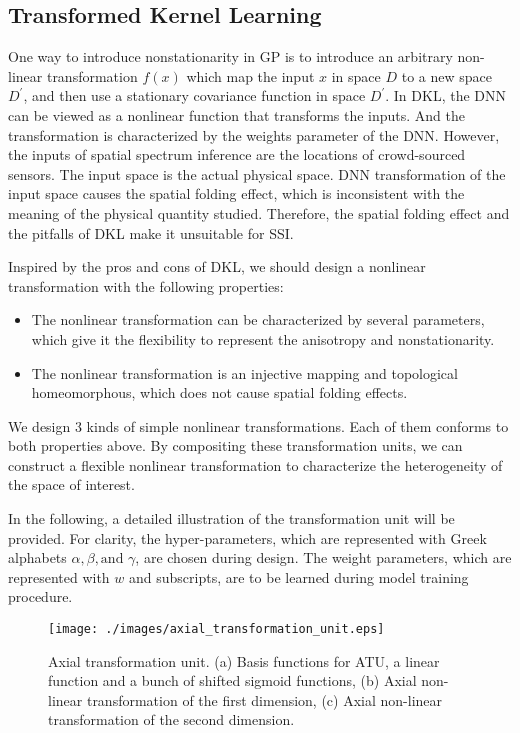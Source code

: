 \documentclass[journal, oneside, twocolumn]{IEEEtran}
\begin{document}
\subsection{Transformed Kernel Learning}
One way to introduce nonstationarity in GP is to introduce an arbitrary non-linear transformation $f(x)$ which map the input $x$ in space $D$ to a new space $D^\prime$, and then use a stationary covariance function in space $D^\prime$\cite{Rasmussen2006}. In DKL, the DNN can be viewed as a nonlinear function that transforms the inputs. And the transformation is characterized by the weights parameter of the DNN. However, the inputs of spatial spectrum inference are the locations of crowd-sourced sensors. The input space is the actual physical space. DNN transformation of the input space causes the spatial folding effect, which is inconsistent with the meaning of the physical quantity studied. Therefore, the spatial folding effect and the pitfalls of DKL make it unsuitable for SSI.

Inspired by the pros and cons of DKL, we should design a nonlinear transformation with the following properties:
\begin{itemize}
  \item The nonlinear transformation can be characterized by several parameters, which give it the flexibility to represent the anisotropy and nonstationarity.
  \item The nonlinear transformation is an injective mapping and topological homeomorphous, which does not cause spatial folding effects.
\end{itemize} 

We design 3 kinds of simple nonlinear transformations. Each of them conforms to both properties above. By compositing these transformation units, we can construct a flexible nonlinear transformation to characterize the heterogeneity of the space of interest. 

In the following, a detailed illustration of the transformation unit will be provided. For clarity, the hyper-parameters, which are represented with Greek alphabets $\alpha, \beta, \text{and } \gamma$, are chosen during design. The weight parameters, which are represented with $w$ and subscripts, are to be learned during model training procedure.

\begin{figure}[!tb]
  \centering
  \texttt{[image: ./images/axial\_transformation\_unit.eps]}
  \caption{Axial transformation unit. (a) Basis functions for ATU, a linear function and a bunch of shifted sigmoid functions, (b) Axial non-linear transformation of the first dimension, (c) Axial non-linear transformation of the second dimension.}
  \label{fig:axial_trans_unit}
\end{figure}
\end{document}
